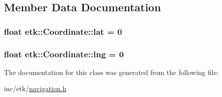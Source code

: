 \subsection{Member Data Documentation}
\hypertarget{classetk_1_1_coordinate_af261adfd9bac16c80b17046726d20c28}{
\subsubsection[{lat}]{\setlength{\rightskip}{0pt plus 5cm}float etk\-::\-Coordinate\-::lat = 0\hspace{0.3cm}{\ttfamily [protected]}}}\label{classetk_1_1_coordinate_af261adfd9bac16c80b17046726d20c28}
\hypertarget{classetk_1_1_coordinate_a87145d8d5f3fb09f0cfc9e0d085aeda7}{
\subsubsection[{lng}]{\setlength{\rightskip}{0pt plus 5cm}float etk\-::\-Coordinate\-::lng = 0\hspace{0.3cm}{\ttfamily [protected]}}}\label{classetk_1_1_coordinate_a87145d8d5f3fb09f0cfc9e0d085aeda7}


The documentation for this class was generated from the following file\-:\begin{DoxyCompactItemize}
\item 
inc/etk/\hyperlink{navigation_8h}{navigation.\-h}\end{DoxyCompactItemize}
